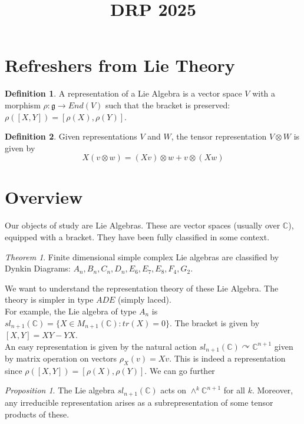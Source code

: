 \documentclass[11pt]{article}
\title{DRP 2025}
\date{}
\theoremstyle{definition}
\newtheorem{definition}{Definition}[section]
\theoremstyle{example}
\theoremstyle{remark}
\theoremstyle{lemma}
\theoremstyle{proposition}
\newtheorem{proposition}{Proposition}[section]
\theoremstyle{Problem}
\theoremstyle{Solution}
\theoremstyle{theorem}
\newtheorem{theorem}{Theorem}[section]
\theoremstyle{corollary}
\begin{document}
\maketitle

\section{Refreshers from Lie Theory}
\begin{definition}
A representation of a Lie Algebra is a vector space $V$ with a morphism $\rho: \mathfrak{g} \to End(V)$ such that the bracket is preserved: $\rho([X,Y]) = [\rho(X),\rho(Y)]$.
\end{definition}
\begin{definition}
Given representations $V$ and $W$, the tensor representation $V\otimes W$ is given by 
$$X(v\otimes w) = (Xv)\otimes w + v\otimes (Xw)$$
\end{definition}



\section{Overview}
Our objects of study are Lie Algebras. These are vector spaces (usually over $\mathbb{C}$), equipped with a bracket. They have been fully classified in some context.
\begin{theorem}
Finite dimensional simple complex Lie algebras are classified by Dynkin Diagrams: $A_n, B_n, C_n, D_n, E_6, E_7, E_8, F_4, G_2$.
\end{theorem}
We want to understand the representation theory of these Lie Algebra. The theory is simpler in type $ADE$ (simply laced).\\

For example, the Lie algebra of type $A_n$ is $sl_{n+1}(\mathbb{C}) = \{X\in M_{n+1}(\mathbb{C}) : tr(X) = 0 \}$. The bracket is given by $[X,Y] = XY - YX$.\\
An easy representation is given by the natural action $sl_{n+1}(\mathbb{C}) \curvearrowright \mathbb{C}^{n+1}$ given by matrix operation on vectors $\rho_X(v)=Xv$. This is indeed a representation since $\rho([X,Y]) = [\rho(X),\rho(Y)]$. We can go further

\begin{proposition}
The Lie algebra $sl_{n+1}(\mathbb{C})$ acts on $\wedge^k \mathbb{C}^{n+1}$ for all $k$. Moreover, any irreducible representation arises as a subrepresentation of some tensor products of these.
\end{proposition}
\end{document}
